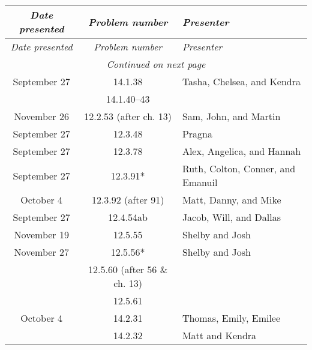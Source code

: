 \documentclass[12pt]{amsart}
\begin{document}
    \begin{longtable}{c|c|l}
        \emph{Date presented} &\emph{Problem number} & \emph{Presenter} \\ \hline
        \endfirsthead
        \emph{Date presented} & \emph{Problem number} & \emph{Presenter} \\ \hline
        \endhead
        \hline
        \multicolumn{3}{c}{\emph{Continued on next page}} \\
        \endfoot
        \hline 
        \endlastfoot
        September 27    & 14.1.38                              & Tasha, Chelsea, and Kendra               \\
                        & 14.1.40--43                          &                                          \\
        November 26     & 12.2.53 (after ch. 13)               & Sam, John, and Martin                    \\
        September 27    & 12.3.48                              & Pragna                                   \\
        September 27    & 12.3.78                              & Alex, Angelica, and Hannah               \\
        September 27    & 12.3.91*                             & Ruth, Colton, Conner, and Emanuil        \\
        October 4       & 12.3.92 (after 91)                   & Matt, Danny, and Mike                    \\
        September 27    & 12.4.54ab                            & Jacob, Will, and Dallas                  \\
        November 19     & 12.5.55                              & Shelby and Josh                          \\
        November 27     & 12.5.56*                             & Shelby and Josh                          \\
                        & 12.5.60 (after 56 \& ch. 13)         &                                          \\
                        & 12.5.61                              &                                          \\
        October 4       & 14.2.31                              & Thomas, Emily, Emilee                    \\
                        & 14.2.32                              & Matt and Kendra                          \\

\end{longtable}
\end{document}
